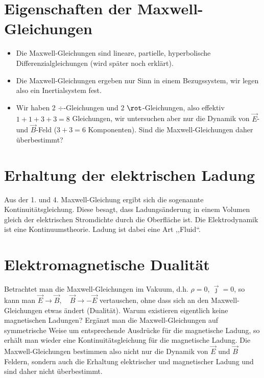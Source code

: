 \documentclass{../../theo-lecture/lecture}
\begin{document}
    \section{Eigenschaften der Maxwell-Gleichungen}
    \begin{itemize}
        \item Die Maxwell-Gleichungen sind lineare, partielle, hyperbolische Differenzialgleichungen (wird später noch erklärt).
        \item Die Maxwell-Gleichungen ergeben nur Sinn in einem Bezugssystem, wir legen also ein Inertialsystem fest.
        \item Wir haben 2 $\div$-Gleichungen und 2 $\rot$-Gleichungen, also effektiv $1 + 1 + 3 + 3 = 8$ Gleichungen, wir untersuchen aber nur die Dynamik von $\vec E$- und $\vec B$-Feld ($3 + 3 = 6$ Komponenten). Sind die Maxwell-Gleichungen daher überbestimmt?
    \end{itemize}
    \section{Erhaltung der elektrischen Ladung}
    Aus der 1. und 4. Maxwell-Gleichung ergibt sich die sogenannte Kontinuitätsgleichung.
    Diese besagt, dass Ladungsänderung in einem Volumen gleich der elektrischen Stromdichte durch die Oberfläche ist.
    Die Elektrodynamik ist eine Kontinuumstheorie. Ladung ist dabei eine Art ,,Fluid``.
    \section{Elektromagnetische Dualität}
    Betrachtet man die Maxwell-Gleichungen im Vakuum, d.h. $\rho = 0$, $\vec{\jmath} = 0$, so kann man $\vec E \to \vec B,\quad \vec B \to -\vec E$ vertauschen, ohne dass sich an den Maxwell-Gleichungen etwas ändert (Dualität).
    Warum existieren eigentlich keine magnetischen Ladungen? Ergänzt man die Maxwell-Gleichungen auf symmetrische Weise um entsprechende Ausdrücke für die magnetische Ladung, so erhält man wieder eine Kontinuitätsgleichung für die magnetische Ladung.
    Die Maxwell-Gleichungen bestimmen also nicht nur die Dynamik von $\vec E$ und $\vec B$ Feldern, sondern auch die Erhaltung elektrischer und magnetischer Ladung und sind daher nicht überbestimmt.
\end{document}
